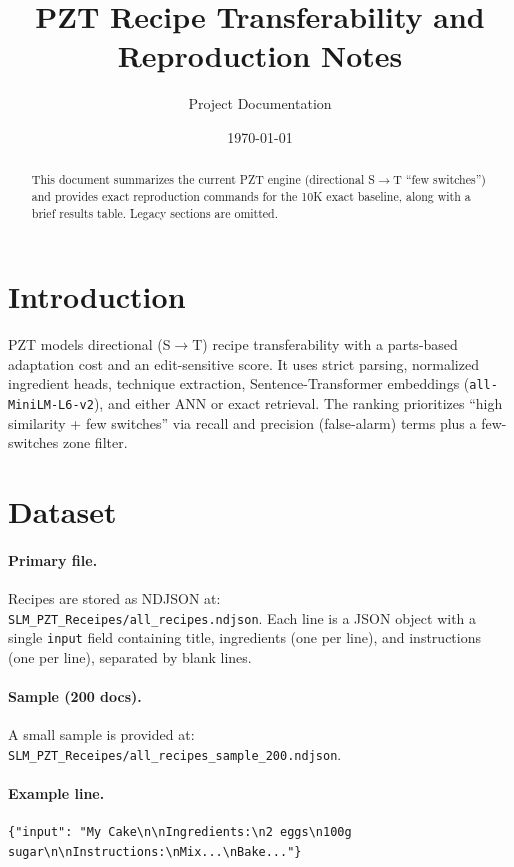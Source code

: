\documentclass[11pt]{article}
\title{PZT Recipe Transferability and Reproduction Notes}
\author{Project Documentation}
\date{\today}
\begin{document}
\maketitle

\begin{abstract}
This document summarizes the current PZT engine (directional S$\to$T ``few switches'') and provides exact reproduction commands for the 10K exact baseline, along with a brief results table. Legacy sections are omitted.
\end{abstract}

\section{Introduction}
PZT models directional (S$\to$T) recipe transferability with a parts-based adaptation cost and an edit-sensitive score. It uses strict parsing, normalized ingredient heads, technique extraction, Sentence-Transformer embeddings (\texttt{all-MiniLM-L6-v2}), and either ANN or exact retrieval. The ranking prioritizes ``high similarity + few switches'' via recall and precision (false-alarm) terms plus a few-switches zone filter.

\section{Dataset}
\paragraph{Primary file.} Recipes are stored as NDJSON at:\\
\texttt{SLM\_PZT\_Receipes/all\_recipes.ndjson}. Each line is a JSON object with a single \texttt{input} field containing title, ingredients (one per line), and instructions (one per line), separated by blank lines.

\paragraph{Sample (200 docs).} A small sample is provided at:\\
\texttt{SLM\_PZT\_Receipes/all\_recipes\_sample\_200.ndjson}.

\paragraph{Example line.}
\begin{verbatim}
{"input": "My Cake\n\nIngredients:\n2 eggs\n100g sugar\n\nInstructions:\nMix...\nBake..."}
\end{verbatim}
\end{document}
